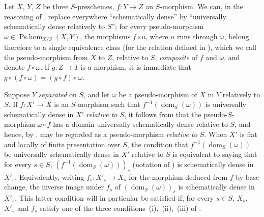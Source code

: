 \begin{env}[20.5.5]
\label{IV.20.5.5}
Let $X$, $Y$, $Z$ be three $S$-preschemes, $f:Y\to Z$ an $S$-morphism.
We can, in the reasoning of , replace everywhere ``schematically dense'' by ``universally schematically dense relatively to $S$'';
for every pseudo-morphism $\omega\in\operatorname{Ps.hom}_{X/S}(X,Y)$, the morphisms $f\circ u$, where $u$ runs through $\omega$, belong therefore to a single equivalence class (for the relation defined in ), which we
call the pseudo-morphism from $X$ to $Z$, relative to $S$, \emph{composite} of $f$ and $\omega$, and denote $f\circ\omega$.
If $g:Z\to T$ is a morphism, it is immediate that $g\circ(f\circ\omega)=(g\circ f)\circ\omega$.
\end{env}

\begin{env}[20.5.6]
\label{IV.20.5.6}
Suppose $Y$ \emph{separated} on $S$, and let $\omega$ be a pseudo-morphism of $X$ in $Y$ relatively to $S$.
If $f:X'\to X$ is an $S$-morphism such that $f^{-1}(\operatorname{dom}_S(\omega))$ is universally schematically dense in $X'$ \emph{relative to $S$}, it follows from  that the pseudo-$S$-morphism $\omega\circ f$ has a domain universally schematically dense relative to $S$, and hence, by , may be regarded as a pseudo-morphism \emph{relative to $S$}.
When $X'$ is flat and locally of finite presentation over $S$, the condition that $f^{-1}(\operatorname{dom}_S(\omega))$ be universally schematically dense in $X'$ relative to $S$ is equivalent to saying that for every $s\in S$, $(f^{-1}(\operatorname{dom}_S(\omega)))_s$ (notation of ) is schematically dense in $X'_s$.
Equivalently, writing $f_s:X'_s\to X_s$ for the morphism deduced from $f$ by base change, the inverse image under $f_s$ of $(\operatorname{dom}_S(\omega))_s$ is schematically dense in $X'_s$.
This latter condition will in particular be satisfied if, for every $s\in S$, $X_s$, $X'_s$ and $f_s$ satisfy one of the three conditions~(i),~(ii),~(iii) of .
\end{env}

